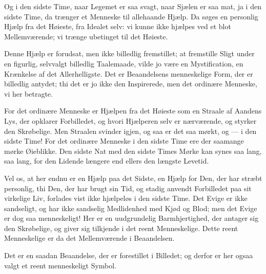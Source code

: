 \documentclass[12pt,a4paper]{book}
\newcommand{\apage}[1]{\marginnote{\footnotesize\textit{[#1]}}}
\begin{document}
Og i den sidste Time, naar Legemet er saa svagt, naar Sjælen er saa mat, ja
i den sidste Time, da trænger et Menneske til allehaande Hjælp. Da søges en
personlig Hjælp fra det Høieste, fra Idealet selv: vi kunne ikke hjælpes
ved et blot Mellemværende; vi trænge ubetinget til det Høieste.

Denne Hjælp er forudsat, men ikke billedlig fremstillet; at fremstille
Sligt under en figurlig, selvvalgt billedlig Taalemaade, vilde jo være en
Mystification, en Krænkelse af det Allerhelligste. Det er Beaandelsens
menneskelige Form, der er billedlig antydet; thi det er jo ikke den
Inspirerede, men det ordinære Menneske, vi her betragte.

For det ordinære Menneske er Hjælpen fra det Høieste som en Straale af
Aandens Lys, der opklarer Forbilledet, og hvori Hjælperen selv er
nærværende, og styrker den Skrøbelige. Men Straalen svinder igjen, og saa
er det saa mørkt, og --- i den sidste Time! For det ordinære Menneske i den
sidste Time ere der saamange mørke Øieblikke. Den sidste Nat med den
sidste Times Mørke kan synes saa lang, saa lang, for den Lidende længere
end ellers den længste Levetid.

Vel os, at her endnu er en Hjælp paa det Sidste, en Hjælp for Den, der har
stræbt personlig, thi Den, der har brugt sin Tid, og stadig anvendt
Forbilledet paa sit virkelige Liv, forlades vist ikke hjælpeløs i den
sidste Time. Det Evige er ikke sandseligt, og har ikke sandselig
Medlidenhed med Kjød og Blod; men det Evige er dog saa menneskeligt! Her er
en uudgrundelig Barmhjertighed, der antager sig den Skrøbelige,
og \apage{113} giver sig tilkjende i det reent Menneskelige. Dette reent Menneskelige
er da det Mellemværende i Beaandelsen.

Det er en saadan Beaandelse, der er forestillet i Billedet; og derfor er
her ogsaa valgt et reent menneskeligt Symbol.
\end{document}
